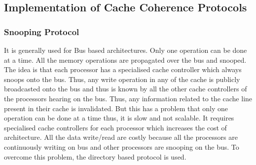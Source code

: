 \documentclass[12pt]{article}
\begin{document}
\subsection{Implementation of Cache Coherence Protocols}
\subsubsection{Snooping Protocol}
It is generally used for Bus based architectures. Only one operation 
can be done at a time. All the memory operations are propagated over the bus and snooped.
The idea is that each processor has a specialised cache controller which always snoops onto the bus.
Thus, any write operation in any of the cache is publicly broadcasted onto the bus and thus is known by all the other cache controllers 
of the processors hearing on the bus. Thus, any information related to the cache line present in their cache is invalidated.
But this has a problem that only one operation can be done at a time thus, it is slow and not scalable. It requires specialised cache 
controllers for each processor which increases the cost of architecture. All the data write/read are costly because all the processors are 
continuously writing on bus and other processors are snooping on the bus.
To overcome this problem, the directory based protocol is used.
\end{document}
